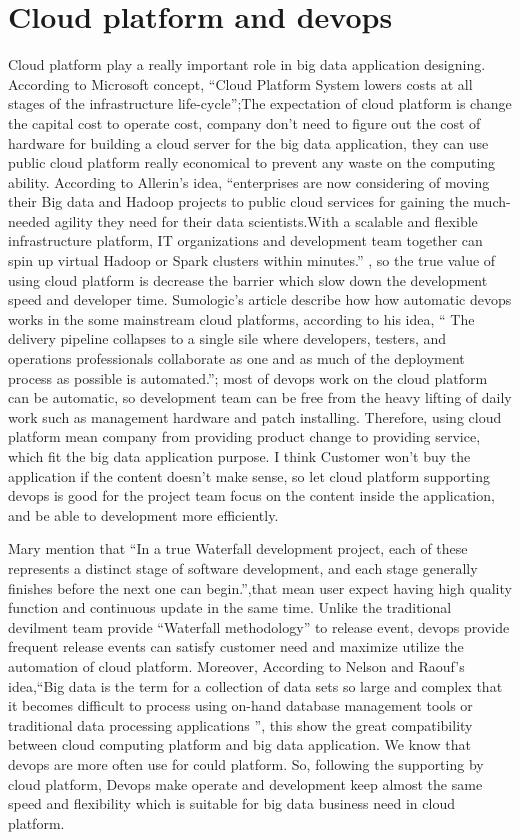 \documentclass[sigconf]{acmart}
\begin{document}
\section{Cloud platform and devops}
Cloud platform play a really important role in big data application designing. According to Microsoft concept, ``Cloud Platform System lowers costs at all stages of the infrastructure life-cycle''\cite{bigdata:03};The expectation of cloud platform is change the capital cost to operate cost, company don't need to figure out the cost of hardware for building a cloud server for the big data application, they can use public cloud platform really economical to prevent any waste on the computing ability. According to Allerin's idea, ``enterprises are now considering of moving their Big data and Hadoop projects to public cloud services for gaining the much-needed agility they need for their data scientists.With a scalable and flexible infrastructure platform, IT organizations and development team together can spin up virtual Hadoop or Spark clusters within minutes.'' \cite{bigdata:02}, so the true value of using cloud platform is decrease the barrier which slow down the development speed and developer time. Sumologic's article describe how how automatic devops works in the some mainstream cloud platforms, according to his idea,  `` The delivery pipeline collapses to a single sile where developers, testers, and operations professionals collaborate as one and as much of the deployment process as possible is automated.''\cite{bigdata:04}; most of devops work on the cloud platform can be automatic, so development team can be free from the heavy lifting of daily work such as management hardware and patch installing. Therefore, using cloud platform mean company from providing product change to providing service, which fit the big data application purpose. I think Customer won't buy the application if the content doesn't make sense, so let cloud platform supporting devops  is good for the project team focus on the content inside the application, and be able to development more efficiently. 

Mary mention that ``In a true Waterfall development project, each of these represents a distinct stage of software development, and each stage generally finishes before the next one can begin.''\cite{agility},that mean user expect having high quality function and continuous update in the same time. Unlike the traditional devilment team provide ``Waterfall methodology'' to release event, devops provide frequent release events can satisfy customer need and maximize utilize the automation of cloud platform. Moreover, According to Nelson and Raouf's idea,``Big data is the term for a collection of data sets so large and complex that it becomes difficult to process using on-hand database management tools or traditional data processing applications ''\cite{platform}, this show the great compatibility between cloud computing platform and big data application. We know that devops are more often use for could platform. So, following the supporting by cloud platform, Devops make operate and development keep almost the same speed and flexibility which is suitable for big data business need in cloud platform.
\end{document}
